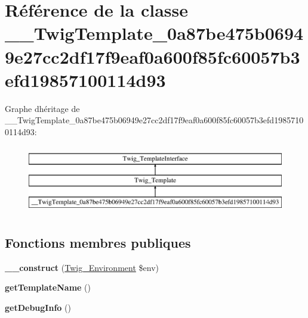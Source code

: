 \hypertarget{class_____twig_template__0a87be475b06949e27cc2df17f9eaf0a600f85fc60057b3efd19857100114d93}{}\section{Référence de la classe \+\_\+\+\_\+\+Twig\+Template\+\_\+0a87be475b06949e27cc2df17f9eaf0a600f85fc60057b3efd19857100114d93}
\label{class_____twig_template__0a87be475b06949e27cc2df17f9eaf0a600f85fc60057b3efd19857100114d93}
Graphe d\textquotesingle{}héritage de \+\_\+\+\_\+\+Twig\+Template\+\_\+0a87be475b06949e27cc2df17f9eaf0a600f85fc60057b3efd19857100114d93\+:\begin{figure}[H]
\begin{center}
\leavevmode
\includegraphics[height=3.000000cm]{class_____twig_template__0a87be475b06949e27cc2df17f9eaf0a600f85fc60057b3efd19857100114d93}
\end{center}
\end{figure}
\subsection*{Fonctions membres publiques}
\begin{DoxyCompactItemize}
\item 
{\bfseries \+\_\+\+\_\+construct} (\hyperlink{class_twig___environment}{Twig\+\_\+\+Environment} \$env)\hypertarget{class_____twig_template__0a87be475b06949e27cc2df17f9eaf0a600f85fc60057b3efd19857100114d93_a4f8326243132c1450a81e0a817aa1be7}{}\label{class_____twig_template__0a87be475b06949e27cc2df17f9eaf0a600f85fc60057b3efd19857100114d93_a4f8326243132c1450a81e0a817aa1be7}

\item 
{\bfseries get\+Template\+Name} ()\hypertarget{class_____twig_template__0a87be475b06949e27cc2df17f9eaf0a600f85fc60057b3efd19857100114d93_a621a3ccd148ed8b9e937da6959c98f39}{}\label{class_____twig_template__0a87be475b06949e27cc2df17f9eaf0a600f85fc60057b3efd19857100114d93_a621a3ccd148ed8b9e937da6959c98f39}

\item 
{\bfseries get\+Debug\+Info} ()\hypertarget{class_____twig_template__0a87be475b06949e27cc2df17f9eaf0a600f85fc60057b3efd19857100114d93_abd0ecb0136f4228db2bd963bfc1e20d7}{}\label{class_____twig_template__0a87be475b06949e27cc2df17f9eaf0a600f85fc60057b3efd19857100114d93_abd0ecb0136f4228db2bd963bfc1e20d7}

\end{DoxyCompactItemize}
